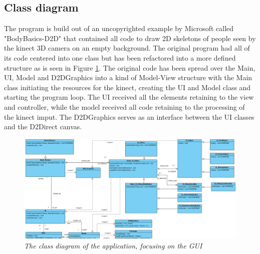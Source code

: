 \subsection{Class diagram}

 The program is build out of an uncopyrighted example by Microsoft called "BodyBasics-D2D" that contained all code to draw 2D skeletons of people seen by the kinect 3D camera on an empty background. The original program had all of its code centered into one class but has been refactored into a more defined structure as is seen in Figure \ref{fig: gui_classdiagram}. The original code has been spread over the Main, UI, Model and D2D\textunderscore Graphics into a kind of Model-View structure with the Main class initiating the resources for the kinect, creating the UI and Model class and starting the program loop. The UI received all the elements retaining to the view and controller, while the model received all code retaining to the processing of the kinect imput. The D2D\textunderscore Graphics serves as an interface between the UI classes and the D2Direct canvas.

\begin{figure}[H]
	\begin{center}
		\includegraphics[width=14cm]{figures/UML_UI.png}
		\caption{\emph{The class diagram of the application, focusing on the GUI}}
		\label{fig: gui_classdiagram}
	\end{center}
\end{figure}

